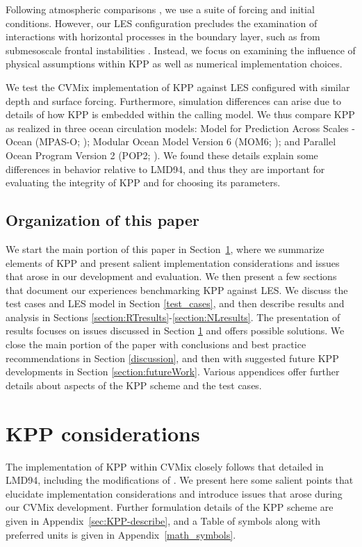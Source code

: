 \documentclass[preprint,12pt,authoryear]{agujournal}
\begin{document}
Following atmospheric comparisons \citep[\textit{e.g.},][]{Ayotte1996}, we use a suite of forcing  and initial conditions. However, our LES configuration precludes the examination of interactions with horizontal processes in the boundary layer, such as from submesoscale frontal instabilities \citep[\textit{e.g.},][]{boccaletti_etal2007,foxkemper_etal2008,bachman2017parameterization}. Instead, we focus on examining the influence of physical assumptions within KPP as well as numerical implementation choices. 

We test the CVMix implementation of KPP against LES configured with similar depth and surface forcing. Furthermore, simulation differences can arise due to details of how KPP is embedded within the calling model.  We thus compare KPP as realized in three ocean circulation models: Model for Prediction Across Scales - Ocean (MPAS-O; \citep{ringler2013multi}); Modular Ocean Model Version 6 (MOM6;  \citep{AdcroftHallberg2006}); and Parallel Ocean Program Version 2 (POP2; \citep{Smith_POP_2010}). We found these details explain some differences in behavior relative to LMD94, and thus they are important for evaluating the integrity of KPP and for choosing its parameters. 

\subsection{Organization of this paper}

We start the main portion of this paper in Section~\ref{issues},  where we summarize elements of KPP and present salient implementation considerations and issues that arose in our development and evaluation. We then present a few sections that document our experiences benchmarking KPP against LES.  We discuss the test cases and LES model in Section \ref{test_cases}, and then describe results and analysis in Sections \ref{section:RTresults}-\ref{section:NLresults}.  The presentation of results focuses on issues discussed in Section \ref{issues} and offers possible solutions. We close the main portion of the paper with conclusions and best practice recommendations in Section \ref{discussion}, and then with suggested future KPP developments in Section \ref{section:futureWork}.  Various appendices offer further details about aspects of the KPP scheme and the test cases.   


\section{KPP considerations}
\label{issues}
The implementation of KPP within CVMix closely follows that detailed in LMD94, including the modifications of \cite{Danabasoglu2006}.  We present here some salient points that elucidate implementation considerations and introduce issues that arose during our CVMix development. Further formulation details of the KPP scheme are given in Appendix~\ref{sec:KPP-describe}, and a Table of symbols along with preferred units is given in Appendix~\ref{math_symbols}. 
\end{document}
